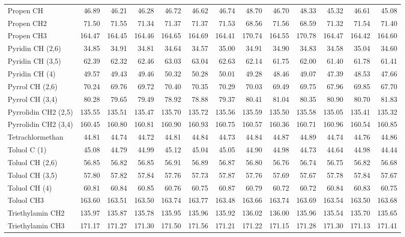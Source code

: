 \begin{table}[ht!]
{\begin{tabular}{lrrrrrrrrrrrr}
    Propen CH & 46.89 & 46.21 & 46.28 & 46.72 & 46.62 & 46.74 & 48.70 & 46.70 & 48.33 & 45.32 & 46.61 & 45.08 \\
    Propen CH2 & 71.50 & 71.55 & 71.34 & 71.37 & 71.37 & 71.53 & 68.56 & 71.56 & 68.59 & 71.32 & 71.54 & 71.40 \\
    Propen CH3 & 164.47 & 164.45 & 164.46 & 164.65 & 164.69 & 164.41 & 170.74 & 164.55 & 170.78 & 164.47 & 164.42 & 164.60 \\
    Pyridin CH (2,6) & 34.85 & 34.91 & 34.81 & 34.64 & 34.57 & 35.00 & 34.91 & 34.90 & 34.83 & 34.58 & 35.04 & 34.60 \\
    Pyridin CH (3,5) & 62.39 & 62.32 & 62.46 & 63.03 & 63.04 & 62.63 & 62.14 & 61.75 & 62.00 & 61.40 & 61.78 & 61.41 \\
    Pyridin CH (4) & 49.57 & 49.43 & 49.46 & 50.32 & 50.28 & 50.01 & 49.28 & 48.46 & 49.07 & 47.39 & 48.53 & 47.66 \\
    Pyrrol CH (2,6) & 70.24 & 69.76 & 69.72 & 70.40 & 70.35 & 70.29 & 70.03 & 69.49 & 69.75 & 67.96 & 69.85 & 67.70 \\
    Pyrrol CH (3,4) & 80.28 & 79.65 & 79.49 & 78.92 & 78.88 & 79.37 & 80.41 & 81.04 & 80.35 & 80.90 & 80.70 & 81.83 \\
    Pyrrolidin CH2 (2,5) & 135.55 & 135.51 & 135.47 & 135.70 & 135.72 & 135.56 & 135.59 & 135.50 & 135.58 & 135.05 & 135.41 & 135.32 \\
    Pyrrolidin CH2 (3,4) & 160.45 & 160.80 & 160.81 & 160.90 & 160.93 & 160.75 & 160.57 & 160.36 & 160.71 & 160.96 & 160.54 & 160.85 \\
    Tetrachlormethan & 44.81 & 44.74 & 44.72 & 44.81 & 44.84 & 44.73 & 44.84 & 44.87 & 44.89 & 44.74 & 44.76 & 44.86 \\
    Toluol C (1) & 45.08 & 44.79 & 44.99 & 45.12 & 45.04 & 45.05 & 44.90 & 44.98 & 44.73 & 44.64 & 44.98 & 44.44 \\
    Toluol CH (2,6) & 56.85 & 56.82 & 56.85 & 56.91 & 56.89 & 56.87 & 56.80 & 56.76 & 56.74 & 56.75 & 56.82 & 56.68 \\
    Toluol CH (3,5) & 57.80 & 57.82 & 57.84 & 57.76 & 57.73 & 57.87 & 57.76 & 57.69 & 57.67 & 57.78 & 57.84 & 57.67 \\
    Toluol CH (4) & 60.81 & 60.84 & 60.85 & 60.76 & 60.75 & 60.87 & 60.79 & 60.72 & 60.72 & 60.84 & 60.83 & 60.75 \\
    Toluol CH3 & 163.60 & 163.51 & 163.50 & 163.74 & 163.77 & 163.48 & 163.66 & 163.74 & 163.69 & 163.54 & 163.50 & 163.68 \\
    Triethylamin CH2 & 135.97 & 135.87 & 135.78 & 135.95 & 135.96 & 135.92 & 136.02 & 136.00 & 135.96 & 135.54 & 135.70 & 135.65 \\
    Triethylamin CH3 & 171.17 & 171.27 & 171.30 & 171.50 & 171.56 & 171.21 & 171.22 & 171.15 & 171.28 & 171.30 & 171.13 & 171.41 \\
    \end{tabular}}%
  \label{tab:sigmacosmors}%
\end{table}%
\vfill
\newpage


